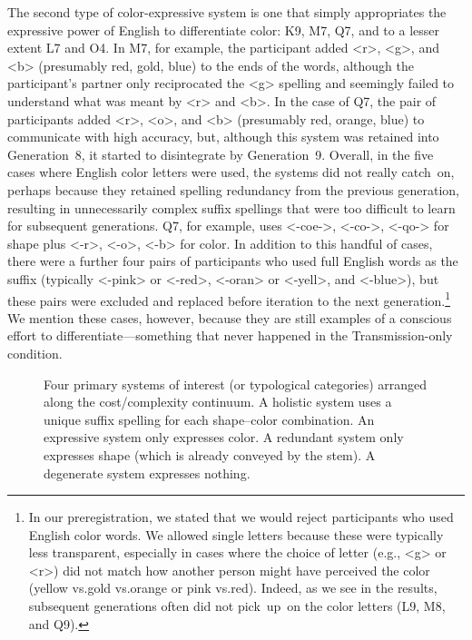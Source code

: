 \documentclass[doc,biblatex]{apa7}
\begin{document}
The second type of color-expressive system is one that simply appropriates the expressive power of English to differentiate color: K9, M7, Q7, and to a lesser extent L7 and O4. In M7, for example, the participant added <r>, <g>, and <b> (presumably red, gold, blue) to the ends of the words, although the participant's partner only reciprocated the <g> spelling and seemingly failed to understand what was meant by <r> and <b>. In the case of Q7, the pair of participants added <r>, <o>, and <b> (presumably red, orange, blue) to communicate with high accuracy, but, although this system was retained into Generation~8, it started to disintegrate by Generation~9. Overall, in the five cases where English color letters were used, the systems did not really catch~on, perhaps because they retained spelling redundancy from the previous generation, resulting in unnecessarily complex suffix spellings that were too difficult to learn for subsequent generations. Q7, for example, uses <-coe->, <-co->, <-qo-> for shape plus <-r>, <-o>, <-b> for color. In addition to this handful of cases, there were a further four pairs of participants who used full English words as the suffix (typically <-pink> or <-red>, <-oran> or <-yell>, and <-blue>), but these pairs were excluded and replaced before iteration to the next generation.\footnote{In our preregistration, we stated that we would reject participants who used English color words. We allowed single letters because these were typically less transparent, especially in cases where the choice of letter (e.g., <g> or <r>) did not match how another person might have perceived the color (yellow vs.\@ gold vs.\@ orange or pink vs.\@ red). Indeed, as we see in the results, subsequent generations often did not pick~up~on the color letters (L9, M8, and Q9).} We mention these cases, however, because they are still examples of a conscious effort to differentiate---something that never happened in the Transmission-only condition.

	\begin{figure}
	\vspace*{2pt}
	\caption{Four primary systems of interest (or typological categories) arranged along the cost/complexity continuum. A holistic system uses a unique suffix spelling for each shape--color combination. An expressive system only expresses color. A redundant system only expresses shape (which is already conveyed by the stem). A degenerate system expresses nothing.}
	\label{fig06}
	\end{figure}
\end{document}
